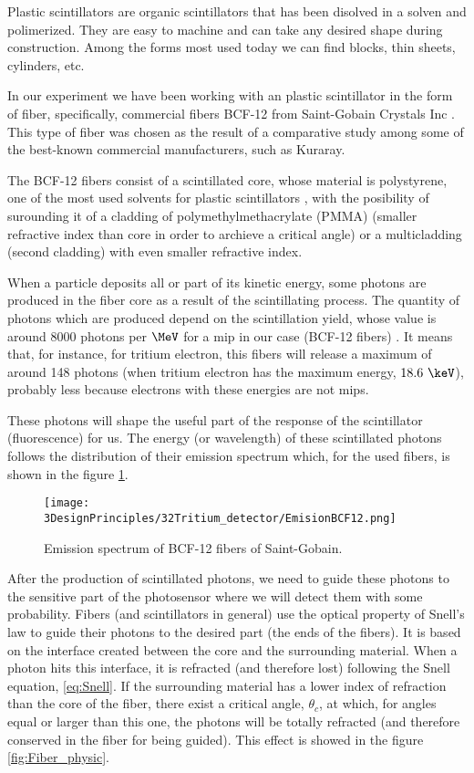 Plastic scintillators are organic scintillators that has been disolved in a solven and polimerized. They are easy to machine and can take any desired shape during construction. Among the forms most used today we can find blocks, thin sheets, cylinders, etc.

In our experiment we have been working with an plastic scintillator in the form of fiber, specifically, commercial fibers BCF-12 from Saint-Gobain Crystals Inc \cite{DataSheetBCF12Fiber}. This type of fiber was chosen as the result of a comparative study among some of the best-known commercial manufacturers, such as Kuraray. 

The BCF-12 fibers consist of a scintillated core, whose material is polystyrene, one of the most used solvents for plastic scintillators \cite{Knoll}, with the posibility of surounding it of a cladding of polymethylmethacrylate (PMMA) (smaller refractive index than core in order to archieve a critical angle) or a multicladding (second cladding) with even smaller refractive index.

When a particle deposits all or part of its kinetic energy, some photons are produced in the fiber core as a result of the scintillating process. The quantity of photons which are produced depend on the scintillation yield, whose value is around $8000$ photons per $\MeV$ for a mip in our case (BCF-12 fibers) . It means that, for instance, for tritium electron, this fibers will release a maximum of around 148 photons (when tritium electron has the maximum energy, $18.6~\keV$), probably less because electrons with these energies are not mips.

These photons will shape the useful part of the response of the scintillator (fluorescence) for us. The energy (or wavelength) of these scintillated photons follows the distribution of their emission spectrum which, for the used fibers, is shown in the figure \ref{fig:EmissionSpectrumFibers}.

\begin{figure}[htbp]
\centering
\texttt{[image: 3DesignPrinciples/32Tritium\_detector/EmisionBCF12.png]}
\caption{Emission spectrum of BCF-12 fibers of Saint-Gobain.\label{fig:EmissionSpectrumFibers}~\cite{DataSheetBCF12Fiber}}
\end{figure}

After the production of scintillated photons, we need to guide these photons to the sensitive part of the photosensor where we will detect them with some probability. Fibers (and scintillators in general) use the optical property of Snell's law \cite{Snell} to guide their photons to the desired part (the ends of the fibers). It is based on the interface created between the core and the surrounding material. When a photon hits this interface, it is refracted (and therefore lost) following the Snell equation, \ref{eq:Snell}. If the surrounding material has a lower index of refraction than the core of the fiber, there exist a critical angle, $\theta_c$, at which, for angles equal or larger than this one, the photons will be totally refracted (and therefore conserved in the fiber for being guided). This effect is showed in the figure \ref{fig:Fiber_physic}.

